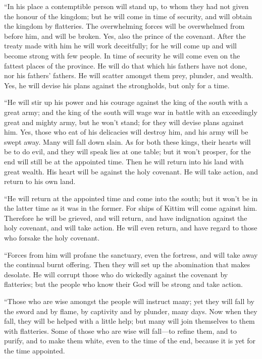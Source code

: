  ``In his place a contemptible person will stand up, to
whom they had not given the honour of the kingdom; but he will come in
time of security, and will obtain the kingdom by flatteries.
 The overwhelming forces will be overwhelmed from before
him, and will be broken. Yes, also the prince of the covenant.
 After the treaty made with him he will work deceitfully;
for he will come up and will become strong with few people.
 In time of security he will come even on the fattest
places of the province. He will do that which his fathers have not done,
nor his fathers' fathers. He will scatter amongst them prey, plunder,
and wealth. Yes, he will devise his plans against the strongholds, but
only for a time.

 ``He will stir up his power and his courage against the
king of the south with a great army; and the king of the south will wage
war in battle with an exceedingly great and mighty army, but he won't
stand; for they will devise plans against him.  Yes, those
who eat of his delicacies will destroy him, and his army will be swept
away. Many will fall down slain.  As for both these kings,
their hearts will be to do evil, and they will speak lies at one table;
but it won't prosper, for the end will still be at the appointed time.
 Then he will return into his land with great wealth. His
heart will be against the holy covenant. He will take action, and return
to his own land.

 ``He will return at the appointed time and come into the
south; but it won't be in the latter time as it was in the former.
 For ships of Kittim will come against him. Therefore he
will be grieved, and will return, and have indignation against the holy
covenant, and will take action. He will even return, and have regard to
those who forsake the holy covenant.

 ``Forces from him will profane the sanctuary, even the
fortress, and will take away the continual burnt offering. Then they
will set up the abomination that makes desolate.  He will
corrupt those who do wickedly against the covenant by flatteries; but
the people who know their God will be strong and take action.

 ``Those who are wise amongst the people will instruct
many; yet they will fall by the sword and by flame, by captivity and by
plunder, many days.  Now when they fall, they will be
helped with a little help; but many will join themselves to them with
flatteries.  Some of those who are wise will fall---to
refine them, and to purify, and to make them white, even to the time of
the end, because it is yet for the time appointed.

